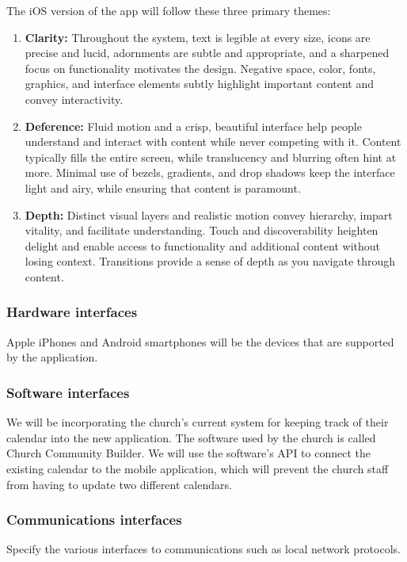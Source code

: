 \documentclass[letterpaper,10pt,draftclsnofoot,onecolumn,titlepage]{IEEEtran}
\begin{document}
	The iOS version of the app will follow these three primary themes:
	\begin{enumerate}
		\item \textbf{Clarity:} Throughout the system, text is legible at every size, icons are precise and lucid, adornments are subtle and appropriate, and a sharpened focus on functionality motivates the design. Negative space, color, fonts, graphics, and interface elements subtly highlight important content and convey interactivity.
		\item \textbf{Deference:} Fluid motion and a crisp, beautiful interface help people understand and interact with content while never competing with it. Content typically fills the entire screen, while translucency and blurring often hint at more. Minimal use of bezels, gradients, and drop shadows keep the interface light and airy, while ensuring that content is paramount.
		\item \textbf{Depth:} Distinct visual layers and realistic motion convey hierarchy, impart vitality, and facilitate understanding. Touch and discoverability heighten delight and enable access to functionality and additional content without losing context. Transitions provide a sense of depth as you navigate through content.
	\end{enumerate}

	\subsubsection{Hardware interfaces}
	Apple iPhones and Android smartphones will be the devices that are supported by the application.

	\subsubsection{Software interfaces}
	We will be incorporating the church's current system for keeping track of their calendar into the new application.
	The software used by the church is called Church Community Builder.
	We will use the software's API to connect the existing calendar to the mobile application, which will prevent the church staff from having to update two different calendars.

	\subsubsection{Communications interfaces}
	Specify the various interfaces to communications such as local network protocols.
\end{document}
